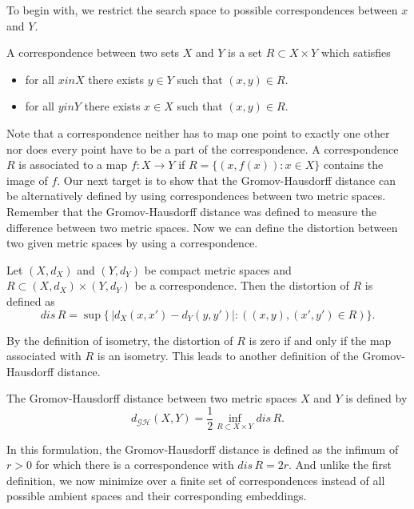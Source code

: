 To begin with, we restrict the search space to possible correspondences between $x$ and $Y$.
\begin{mydef}[correspondence]
	A correspondence between two sets $X$ and $Y$ is a set $R \subset X \times Y$ which satisfies
	\begin{itemize}
		\item for all $x in X$ there exists $y\in Y$ such that $(x,y) \in R$.
		\item for all $y in Y$ there exists $x\in X$ such that $(x,y) \in R$.
	\end{itemize}
\end{mydef}
Note that a correspondence neither has to map one point to exactly one other nor does every point have to be a part of the correspondence.
A correspondence $R$ is associated to a map $f: X \rightarrow Y$ if $R = \{(x,f(x)) :x \in X\}$ contains the image of $f$.
Our next target is to show that the Gromov-Hausdorff distance can be alternatively defined by using correspondences between two metric spaces.
Remember that the Gromov-Hausdorff distance was defined to measure the difference between two metric spaces.
Now we can define the distortion between two given metric spaces by using a correspondence.
\begin{mydef}
	Let $(X,d_X)$ and $(Y,d_Y)$ be compact metric spaces and $R \subset (X,d_X) \times (Y,d_Y)$ be a correspondence.
	Then the distortion of $R$ is defined as
	$$dis\,R = \sup\{\,|d_X(x,x') - d_Y(y,y')|: \left( (x,y), (x',y') \in R \right)\}.$$
\end{mydef}
By the definition of isometry, the distortion of $R$ is zero if and only if the map associated with $R$ is an isometry.
This leads to another definition of the Gromov-Hausdorff distance.
\begin{mydef}
	The Gromov-Hausdorff distance between two metric spaces $X$ and $Y$ is defined by
	$$d_\mathcal{GH}(X,Y) = \frac{1}{2} \inf_{R \subset X \times Y} dis \, R.$$
\end{mydef}
In this formulation, the Gromov-Hausdorff distance is defined as the infimum of $r > 0$ for which there is a correspondence with $dis\,R = 2r$.
And unlike the first definition, we now minimize over a finite set of correspondences instead of all possible ambient spaces and their corresponding embeddings.

